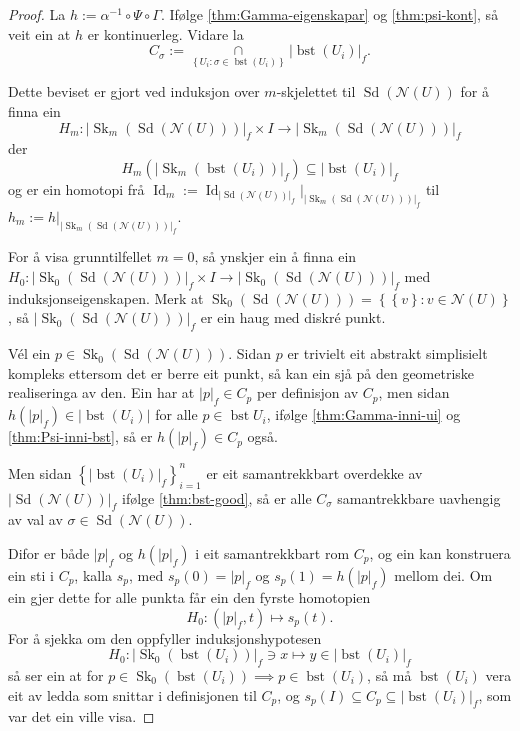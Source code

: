 \documentclass[a4paper, 12pt, norsk]{article}
\theoremstyle{plain}
\theoremstyle{definition}
\newcommand{\Nc}{\mathcal{N}}
\newcommand{\intersect}{ \mathop{\cap}\limits }
\newcommand{\gr}[1]{ \lvert #1 \rvert } %
\newcommand{\set}[1]{ \left\{ #1 \right\} } %
\DeclareMathOperator{\Sd}{Sd} %
\DeclareMathOperator{\bst}{bst} %
\DeclareMathOperator{\Sk}{Sk} %
\DeclareMathOperator{\Id}{Id} %
\begin{document}
\begin{proof}
	La \( h := \alpha^{-1} \circ \Psi \circ \Gamma \). Ifølge \autoref{thm:Gamma-eigenskapar} og \autoref{thm:psi-kont}, så veit ein at \( h \) er kontinuerleg. Vidare la 
	\[ 
		C_\sigma := \intersect_{\set{ U_i : \sigma \in \bst(U_i) }} \gr{\bst(U_i)}_f.
	\]

	Dette beviset er gjort ved induksjon over \( m \)-skjelettet til \( \Sd(\Nc(U)) \) for å finna ein 
	\[ 
		H_m : \gr{\Sk_m(\Sd(\Nc(U)))}_f \times I \to \gr{\Sk_m(\Sd(\Nc(U)))}_f
	\]
	der 
	\[
		H_m(\gr{\Sk_m(\bst(U_i))}_f) \subseteq \gr{\bst(U_i)}_f
	\]
	og er ein homotopi frå \( \Id_m := \Id_{\gr{\Sd(\Nc(U))}_f}|_{\gr{\Sk_m(\Sd(\Nc(U)))}_f} \) til \( h_m := h|_{\gr{\Sk_m(\Sd(\Nc(U)))}_f} \).

	For å visa grunntilfellet \( m = 0 \), så ynskjer ein å finna ein \( H_0: \gr{\Sk_0(\Sd(\Nc(U)))}_f \times I \to \gr{\Sk_0(\Sd(\Nc(U)))}_f \) med induksjonseigenskapen. Merk at \( \Sk_0(\Sd(\Nc(U))) = \set{\set{v} : v \in \Nc(U)} \), så \( \gr{\Sk_0(\Sd(\Nc(U)))}_f \) er ein haug med diskré punkt.

	Vél ein \( p \in \Sk_0(\Sd(\Nc(U))) \). Sidan \( p \) er trivielt eit abstrakt simplisielt kompleks ettersom det er berre eit punkt, så kan ein sjå på den geometriske realiseringa av den. Ein har at \( \gr{p}_f \in C_p \) per definisjon av \( C_p \), men sidan \( h(\gr{p}_f) \in \gr{\bst(U_i)} \) for alle \( p \in \bst{U_i} \), ifølge \autoref{thm:Gamma-inni-ui} og \autoref{thm:Psi-inni-bst}, så er \( h(\gr{p}_f) \in C_p \) også.

	Men sidan \( \set{\gr{\bst(U_i)}_f}_{i = 1}^{n} \) er eit samantrekkbart overdekke av \( \gr{\Sd(\Nc(U))}_f \) ifølge \autoref{thm:bst-good}, så er alle \( C_\sigma \) samantrekkbare uavhengig av val av \( \sigma \in \Sd(\Nc(U)) \).

	Difor er både \( \gr{p}_f \) og \( h(\gr{p}_f) \) i eit samantrekkbart rom \( C_p \), og ein kan konstruera ein sti i \( C_p \), kalla \( s_p \), med \( s_p(0) = \gr{p}_f \) og \( s_p(1) = h(\gr{p}_f) \) mellom dei. Om ein gjer dette for alle punkta får ein den fyrste homotopien
	\[
		H_0 : (\gr{p}_f, t) \mapsto s_p(t).
	\]
	For å sjekka om den oppfyller induksjonshypotesen
	\[
		H_0: \gr{\Sk_0(\bst(U_i))}_f \ni x \mapsto y \in \gr{\bst(U_i)}_f
	\]
	så ser ein at for \( p \in \Sk_0(\bst(U_i)) \implies p \in \bst(U_i) \), så må \( \bst(U_i) \) vera eit av ledda som snittar i definisjonen til \( C_p \), og \( s_p(I) \subseteq C_p \subseteq \gr{\bst(U_i)}_f \), som var det ein ville visa.


\end{proof}
\end{document}
